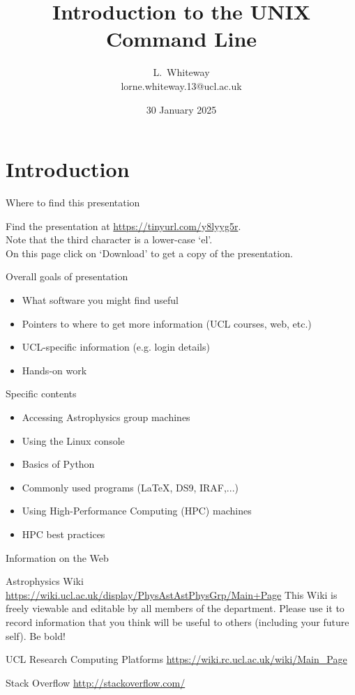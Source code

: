 \documentclass{beamer}
\title{Introduction to the UNIX Command Line}
\author{L.~Whiteway \\ lorne.whiteway.13@ucl.ac.uk}
\institute[UCL]
{
  Astrophysics Group\\
  Department of Physics and Astronomy\\
  University College London
}
\date
{30 January 2025}
\begin{document}
\frame{\titlepage}

\section{Introduction}

\begin{frame}{Where to find this presentation}
  \begin{block}{}
    Find the presentation at \alert{\url{https://tinyurl.com/y8lyyg5r}}.\\
    Note that the third character is a lower-case `el'. \\
    On this page click on `Download' to get a copy of the presentation.
  \end{block}
\end{frame}


\begin{frame}{Overall goals of presentation}
  \begin{itemize}
    \item What software you might find useful
    \item Pointers to where to get more information (UCL courses, web, etc.)
    \item UCL-specific information (e.g. login details)
    \item Hands-on work
  \end{itemize}
\end{frame}

\begin{frame}{Specific contents}
  \begin{itemize}
    \item Accessing Astrophysics group machines
    \item Using the Linux console
    \item Basics of Python
    \item Commonly used programs (LaTeX, DS9, IRAF,...)
    \item Using High-Performance Computing (HPC) machines
    \item HPC best practices
  \end{itemize}
\end{frame}

\begin{frame}{Information on the Web}
  \begin{block}{Astrophysics Wiki}
    \url{https://wiki.ucl.ac.uk/display/PhysAstAstPhysGrp/Main+Page}
    This Wiki is freely viewable and editable by all members of the department. Please use it to record information that you think will be useful to others (including your future self). Be bold!
  \end{block}

  \begin{block}{UCL Research Computing Platforms}
    \url{https://wiki.rc.ucl.ac.uk/wiki/Main_Page}
  \end{block}
  
  \begin{block}{Stack Overflow}
    \url{http://stackoverflow.com/}
  \end{block}
  
\end{frame}
\end{document}
